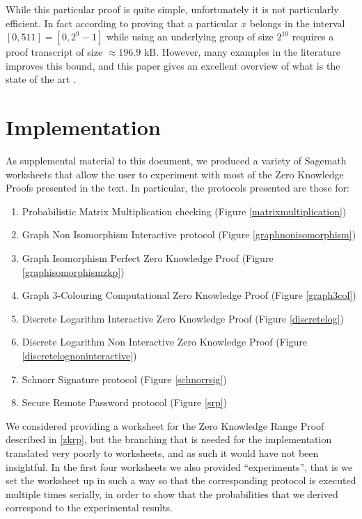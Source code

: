 \documentclass{article}
\begin{document}
While this particular proof is quite simple, unfortunately it is not particularly efficient. In fact according to \cite{boudotEfficientProofsThat2000}
proving that a particular $x$ belongs in the interval $[0, 511] = [0, 2^9 -1]$ while using an underlying group of size $2^{10}$ requires a proof
transcript of size $\approx 196.9$ kB. However, many examples in the literature improves this bound, and this paper gives
an excellent overview of what is the state of the art \cite{moraisSurveyZeroKnowledge2019}.

\section{Implementation}
\label{implementation}
As supplemental material to this document, we produced a variety of Sagemath worksheets that allow the user to experiment
with most of the Zero Knowledge Proofs presented in the text. In particular, the protocols presented are those for:
\begin{enumerate}
    \item Probabilistic Matrix Multiplication checking (Figure \ref{matrixmultiplication})
    \item Graph Non Isomorphism Interactive protocol (Figure \ref{graphnonisomorphism})
    \item Graph Isomorphism Perfect Zero Knowledge Proof (Figure \ref{graphisomorphismzkp})
    \item Graph 3-Colouring Computational Zero Knowledge Proof (Figure \ref{graph3col})
    \item Discrete Logarithm Interactive Zero Knowledge Proof (Figure \ref{discretelog})
    \item Discrete Logarithm Non Interactive Zero Knowledge Proof (Figure \ref{discretelognoninteractive})
    \item Schnorr Signature protocol (Figure \ref{schnorrsig})
    \item Secure Remote Password protocol (Figure \ref{srp})
\end{enumerate}

We considered providing a worksheet for the Zero Knowledge Range Proof described in \ref{zkrp}, but the branching that
is needed for the implementation translated very poorly to worksheets, and as such it would have not been insightful.
In the first four worksheets we also provided \enquote{experiments}, that is we set the worksheet up in such a way so that the corresponding
protocol is executed multiple times serially, in order to show that the probabilities that we derived correspond to
the experimental results.
\end{document}
